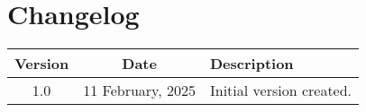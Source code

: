 \documentclass[a4paper,12pt]{article}
\begin{document}
\section*{Changelog}

\begin{longtable}{|c|c|l|}
    \hline
    \textbf{Version} & \textbf{Date} & \textbf{Description} \\
    \hline
    1.0 & 11 February, 2025 & Initial version created. \\
    \hline
\end{longtable}
\end{document}
